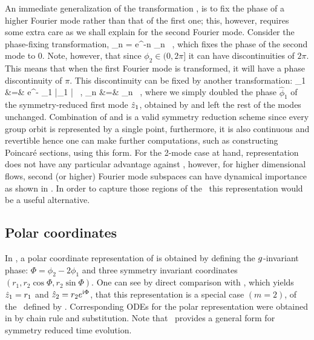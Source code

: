 An immediate generalization of the transformation ,
is to fix the phase of a higher Fourier mode rather than that of the first one; this, however, requires
some extra care as we shall explain for the second Fourier mode.
Consider the phase-fixing transformation,
\beq
	\sspRedC_n = e^{-\ii n } \sspC_n \, ,
	\label{e-2ndmodeTransform}
\eeq
which fixes the phase of the second mode to $0$. Note, however, that since
$\phi_2 \in (0, 2 \pi]$ it can have discontinuities of $2 \pi$. This means  
that when the first Fourier mode is transformed, it will have a phase discontinuity 
of $\pi$. This discontinuity can be fixed by another
transformation:
\bea
	\tilde{\sspC}_1 &=& e^{- \hat{\phi}_1} |\sspRedC_1 | \, , \continue
	\tilde{\sspC}_{n } &=& \sspRedC_n \, ,
	\label{e-PhaseDoubling}
\eea
where we simply doubled the phase $\hat{\phi}_1$ of the symmetry-reduced
first mode $\hat{z}_1$, obtained by  and left
the rest of the modes unchanged. Combination of 
and  is a valid symmetry reduction scheme since every
group orbit is represented by a single point, furthermore, it is also continuous
and revertible hence one can make further computations, such as constructing
Poincar\'{e} sections, using this form. For the 2-mode case at hand, representation
 does not have any particular advantage against
, however, for higher dimensional flows, second
(or higher) Fourier mode subspaces can have dynamical importance as shown in
. In order to capture those regions of the \statesp\ this
representation would be a useful alternative.

\subsection{Polar coordinates}
\label{s-polar}

In , a polar coordinate representation of 
is obtained by defining the $g$-invariant phase: $\Phi = \phi_2 - 2 \phi_1$
and three symmetry invariant coordinates $(r_1, r_2 \cos \Phi, r_2 \sin \Phi)$.
One can see by direct comparison with , which
yields $\hat{z}_1 = r_1$ and $\hat{z}_2 = r_2 e^{\mathrm{i} \Phi}$, that this
representation is a special case $(m=2)$, of the \slice\ defined by
. Corresponding ODEs for the polar representation
were obtained in  by  chain rule and substitution. Note
that \mslices\ provides a general form  for symmetry
reduced time evolution.
